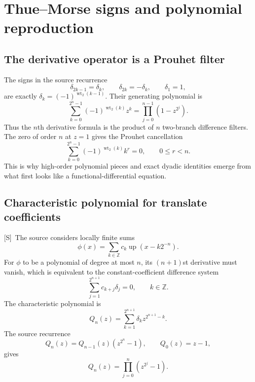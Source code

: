 \documentclass[11pt,oneside]{article}
\theoremstyle{definition}
\theoremstyle{remark}
\newcommand{\Z}{\mathbb Z}
\newcommand{\Up}{\operatorname{up}}
\newcommand{\wt}{\operatorname{wt}_2}
\newcommand{\Smark}{\textcolor{sourceblue}{\textsf{[S]}}}
\begin{document}
\section{Thue--Morse signs and polynomial reproduction}
\label{sec:thue-morse}

\subsection{The derivative operator is a Prouhet filter}

The signs in the source recurrence
\begin{equation}
 \delta_{2k-1}=\delta_k,\qquad \delta_{2k}=-\delta_k,
 \qquad\delta_1=1,
 \label{eq:delta-recursion}
\end{equation}
are exactly
$\delta_k=(-1)^{\wt(k-1)}$.  Their generating polynomial is
\begin{equation}
 \sum_{k=0}^{2^n-1}(-1)^{\wt(k)}z^k
 =\prod_{j=0}^{n-1}(1-z^{2^j}).
 \label{eq:TM-product}
\end{equation}
Thus the $n$th derivative formula is the product of $n$ two-branch difference filters.  The
zero of order $n$ at $z=1$ gives the Prouhet cancellation
\begin{equation}
 \sum_{k=0}^{2^n-1}(-1)^{\wt(k)}k^r=0,
 \qquad 0\le r<n.
 \label{eq:Prouhet}
\end{equation}
This is why high-order polynomial pieces and exact dyadic identities emerge from what first
looks like a functional-differential equation.

\subsection{Characteristic polynomial for translate coefficients}

\Smark\ The source considers locally finite sums
\begin{equation}
 \phi(x)=\sum_{k\in\Z}c_k\Up(x-k2^{-n}).
 \tag{S3.76}
 \label{eq:translate-sum}
\end{equation}
For $\phi$ to be a polynomial of degree at most $n$, its $(n+1)$st derivative must vanish,
which is equivalent to the constant-coefficient difference system
\begin{equation}
 \sum_{j=1}^{2^{n+1}}c_{k+j}\delta_j=0,
 \qquad k\in\Z.
 \tag{S3.77}
 \label{eq:coefficient-recurrence}
\end{equation}
The characteristic polynomial is
\begin{equation}
 Q_n(z)=\sum_{k=1}^{2^{n+1}}\delta_kz^{2^{n+1}-k}.
 \tag{S3.79}
 \label{eq:Qn-def}
\end{equation}
The source recurrence
\begin{equation}
 Q_n(z)=Q_{n-1}(z)(z^{2^n}-1),\qquad Q_0(z)=z-1,
 \tag{S3.80--S3.81}
 \label{eq:Qn-recurrence}
\end{equation}
gives
\begin{equation}
 \boxed{\quad Q_n(z)=\prod_{j=0}^{n}(z^{2^j}-1).\quad}
 \label{eq:Qn-product}
\end{equation}
\end{document}

